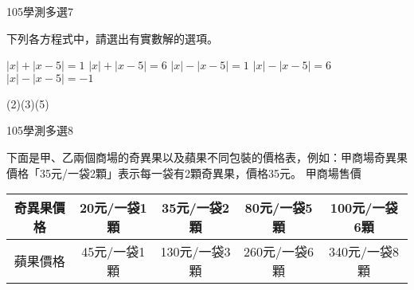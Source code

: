 \begin{QUESTIONS}
    \begin{QUESTION}
        \begin{ExamInfo}{105}{學測}{多選}{7}
        \end{ExamInfo}
        \begin{ExamAnsRateInfo}{54}{81}{52}{29}
        \end{ExamAnsRateInfo}
        \begin{QBODY}
            下列各方程式中，請選出有實數解的選項。
			\begin{QOPS}
				\QOP $\left| x \right|+\left| x-5 \right|=1$
				\QOP $\left| x \right|+\left| x-5 \right|=6$
				\QOP $\left| x \right|-\left| x-5 \right|=1$
				\QOP $\left| x \right|-\left| x-5 \right|=6$
				\QOP $\left| x \right|-\left| x-5 \right|=-1$
			\end{QOPS}
        \end{QBODY}
        \begin{QFROMS}
        \end{QFROMS}
        \begin{QTAGS}\end{QTAGS}
        \begin{QANS}
            (2)(3)(5)
        \end{QANS}
        \begin{QSOLLIST}
        \end{QSOLLIST}
        \begin{QEMPTYSPACE}
        \end{QEMPTYSPACE}
    \end{QUESTION}
    \begin{QUESTION}
        \begin{ExamInfo}{105}{學測}{多選}{8}
        \end{ExamInfo}
        \begin{ExamAnsRateInfo}{59}{77}{60}{40}
        \end{ExamAnsRateInfo}
        \begin{QBODY}
            下面是甲、乙兩個商場的奇異果以及蘋果不同包裝的價格表，例如：甲商場奇異果價格「35元/一袋2顆」表示每一袋有2顆奇異果，價格35元。
			甲商場售價
			\begin{tabular}{|c|c|c|c|c|}
			\hline
				奇異果價格	& 20元/一袋1顆	& 35元/一袋2顆	& 80元/一袋5顆	& 100元/一袋6顆 \\\hline
				蘋果價格	& 45元/一袋1顆	& 130元/一袋3顆	& 260元/一袋6顆	& 340元/一袋8顆 \\\hline

\end{tabular}
\end{QBODY}
\end{QUESTION}
\end{QUESTIONS}
